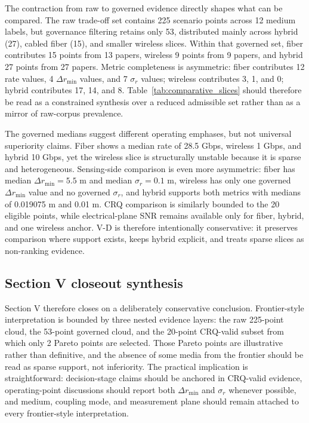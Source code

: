\documentclass[letterpaper,journal]{IEEEtran}
\begin{document}
The contraction from raw to governed evidence directly shapes what can be compared. The raw trade-off set contains 225 scenario points across 12 medium labels, but governance filtering retains only 53, distributed mainly across hybrid (27), cabled fiber (15), and smaller wireless slices. Within that governed set, fiber contributes 15 points from 13 papers, wireless 9 points from 9 papers, and hybrid 27 points from 27 papers. Metric completeness is asymmetric: fiber contributes 12 rate values, 4 $\Delta r_{\min}$ values, and 7 $\sigma_r$ values; wireless contributes 3, 1, and 0; hybrid contributes 17, 14, and 8. Table~\ref{tab:comparative_slices} should therefore be read as a constrained synthesis over a reduced admissible set rather than as a mirror of raw-corpus prevalence.

The governed medians suggest different operating emphases, but not universal superiority claims. Fiber shows a median rate of 28.5 Gbps, wireless 1 Gbps, and hybrid 10 Gbps, yet the wireless slice is structurally unstable because it is sparse and heterogeneous. Sensing-side comparison is even more asymmetric: fiber has median $\Delta r_{\min}=5.5$ m and median $\sigma_r=0.1$ m, wireless has only one governed $\Delta r_{\min}$ value and no governed $\sigma_r$, and hybrid supports both metrics with medians of 0.019075 m and 0.01 m. CRQ comparison is similarly bounded to the 20 eligible points, while electrical-plane SNR remains available only for fiber, hybrid, and one wireless anchor. V-D is therefore intentionally conservative: it preserves comparison where support exists, keeps hybrid explicit, and treats sparse slices as non-ranking evidence.





\subsection*{Section V closeout synthesis}
Section V therefore closes on a deliberately conservative conclusion. Frontier-style interpretation is bounded by three nested evidence layers: the raw 225-point cloud, the 53-point governed cloud, and the 20-point CRQ-valid subset from which only 2 Pareto points are selected. Those Pareto points are illustrative rather than definitive, and the absence of some media from the frontier should be read as sparse support, not inferiority. The practical implication is straightforward: decision-stage claims should be anchored in CRQ-valid evidence, operating-point discussions should report both $\Delta r_{\min}$ and $\sigma_r$ whenever possible, and medium, coupling mode, and measurement plane should remain attached to every frontier-style interpretation.
\end{document}
